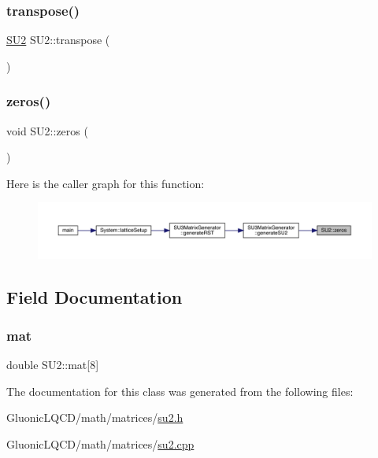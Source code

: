\subsubsection{\texorpdfstring{transpose()}{transpose()}}
{\footnotesize\ttfamily \mbox{\hyperlink{class_s_u2}{S\+U2}} S\+U2\+::transpose (\begin{DoxyParamCaption}{ }\end{DoxyParamCaption})}

\mbox{\label{class_s_u2_a348ca5d38346892060a05f7d9de02916}} 
\subsubsection{\texorpdfstring{zeros()}{zeros()}}
{\footnotesize\ttfamily void S\+U2\+::zeros (\begin{DoxyParamCaption}{ }\end{DoxyParamCaption})\hspace{0.3cm}{\ttfamily [inline]}}

Here is the caller graph for this function\+:\nopagebreak
\begin{figure}[H]
\begin{center}
\leavevmode
\includegraphics[width=350pt]{class_s_u2_a348ca5d38346892060a05f7d9de02916_icgraph}
\end{center}
\end{figure}


\subsection{Field Documentation}
\mbox{\label{class_s_u2_ad4227484be245b63489c44a2bc02a625}} 
\subsubsection{\texorpdfstring{mat}{mat}}
{\footnotesize\ttfamily double S\+U2\+::mat\mbox{[}8\mbox{]}}



The documentation for this class was generated from the following files\+:\begin{DoxyCompactItemize}
\item 
Gluonic\+L\+Q\+C\+D/math/matrices/\mbox{\hyperlink{su2_8h}{su2.\+h}}\item 
Gluonic\+L\+Q\+C\+D/math/matrices/\mbox{\hyperlink{su2_8cpp}{su2.\+cpp}}\end{DoxyCompactItemize}

